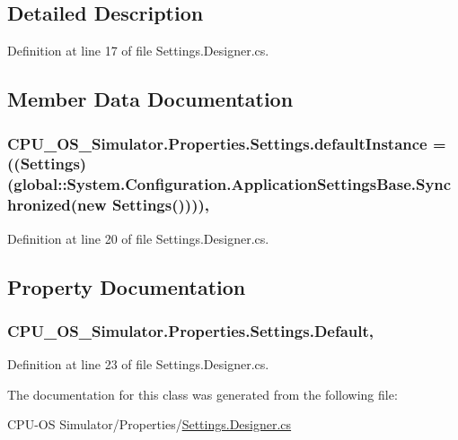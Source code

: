 \subsection{Detailed Description}


Definition at line 17 of file Settings.\+Designer.\+cs.



\subsection{Member Data Documentation}
\hypertarget{class_c_p_u___o_s___simulator_1_1_properties_1_1_settings_a9016562ea46f792bf8dc8d3e79dd36ae}{}
\subsubsection[{default\+Instance}]{ C\+P\+U\+\_\+\+O\+S\+\_\+\+Simulator.\+Properties.\+Settings.\+default\+Instance = (({\bf Settings})(global\+::\+System.\+Configuration.\+Application\+Settings\+Base.\+Synchronized(new {\bf Settings}())))\hspace{0.3cm}{\ttfamily [static]}, {\ttfamily [private]}}\label{class_c_p_u___o_s___simulator_1_1_properties_1_1_settings_a9016562ea46f792bf8dc8d3e79dd36ae}


Definition at line 20 of file Settings.\+Designer.\+cs.



\subsection{Property Documentation}
\hypertarget{class_c_p_u___o_s___simulator_1_1_properties_1_1_settings_a423993327c18a4dfede5f73981018fca}{}
\subsubsection[{Default}]{ C\+P\+U\+\_\+\+O\+S\+\_\+\+Simulator.\+Properties.\+Settings.\+Default\hspace{0.3cm}{\ttfamily [static]}, {\ttfamily [get]}}\label{class_c_p_u___o_s___simulator_1_1_properties_1_1_settings_a423993327c18a4dfede5f73981018fca}


Definition at line 23 of file Settings.\+Designer.\+cs.



The documentation for this class was generated from the following file\+:\begin{DoxyCompactItemize}
\item 
C\+P\+U-\/\+O\+S Simulator/\+Properties/\hyperlink{_settings_8_designer_8cs}{Settings.\+Designer.\+cs}\end{DoxyCompactItemize}
